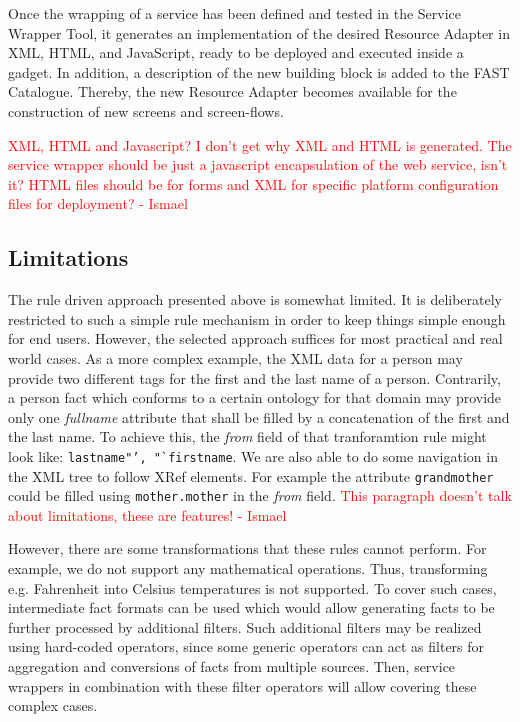 \documentclass{fast_latex}
\begin{document}
{Once the wrapping of a service has been defined and tested in the Service Wrapper Tool, it generates an implementation of the desired Resource Adapter in XML, HTML, and JavaScript, ready to be deployed and executed inside a gadget. In addition, a description of the new building block is added to the FAST Catalogue. Thereby, the new Resource Adapter becomes available for the construction of new screens and screen-flows.

\textcolor{red}{XML, HTML and Javascript? I don't get why XML and HTML is generated. The service wrapper should be just a javascript encapsulation of the web service, isn't it? HTML files should be for forms and XML for specific platform configuration files for deployment? - Ismael}


\subsection{Limitations} %
\label{sub:limitations}

The rule driven approach presented above is somewhat limited. It is deliberately restricted to such a simple rule mechanism in order to keep things simple enough for end users. However, the selected approach suffices for most practical and real world cases. As a more complex example, the XML data for a person may provide two different tags for the first and the last name of a person. Contrarily, a person fact which conforms to a certain ontology for that domain may provide only one \emph{fullname} attribute that shall be filled by a concatenation of the first and the last name. To achieve this, the \textit{from} field of that tranforamtion rule might look like: \texttt{lastname"', "`firstname}. We are also able to do some navigation in the XML tree to follow XRef elements. For example the attribute \texttt{grandmother} could be filled using \texttt{mother.mother} in the \textit{from} field.
\textcolor{red}{This paragraph doesn't talk about limitations, these are features! - Ismael} 

However, there are some transformations that these rules cannot perform. For example, we do not support any mathematical operations. Thus, transforming e.g. Fahrenheit into Celsius temperatures is not supported. To cover such cases, intermediate fact formats can be used which would allow generating facts to be further processed by additional filters. Such additional filters may be realized using hard-coded operators, since some generic operators can act as filters for aggregation and conversions of facts from multiple sources. Then, service wrappers in combination with these filter operators will allow covering these complex cases.

}
\end{document}
